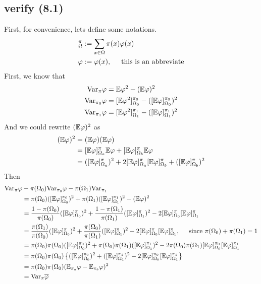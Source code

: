 \documentclass{article}
\begin{document}
\subsection{verify (8.1)}
First, for convenience, lets define some notations.
\begin{align*}
  [\E\varphi]_{\Omega}^\pi &:= \sum_{x\in\Omega} \pi(x)\varphi(x) \\
  \varphi &:= \varphi(x), \hspace{0.5cm} \mbox{this is an abbreviate}
\end{align*}
First, we know that
\begin{align*}
  \mathrm{Var}_\pi \varphi &= \mathbb{E}\varphi^2 - (\mathbb{E}\varphi)^2 \\
  \mathrm{Var}_{\pi_0}\varphi &= [\mathbb{E}\varphi^2]_{\Omega_0}^{\pi_0} - ( [\mathbb{E}\varphi]_{\Omega_0}^{\pi_0})^2 \\
  \mathrm{Var}_{\pi_1}\varphi &= [\mathbb{E}\varphi^2]_{\Omega_1}^{\pi_1} - ( [\mathbb{E}\varphi]_{\Omega_1}^{\pi_1})^2 
\end{align*}
And we could rewrite $(\mathbb{E}\varphi)^2$ as
\begin{align*}
  (\mathbb{E}\varphi)^2 &= (\mathbb{E}\varphi)(\mathbb{E}\varphi) \\
  &= [\mathbb{E}\varphi]_{\Omega_a}^\pi\mathbb{E}\varphi + [\mathbb{E}\varphi]_{\Omega_b}^\pi \mathbb{E}\varphi \\
&= ([\mathbb{E}\varphi]_{\Omega_a}^\pi)^2 + 2[\mathbb{E}\varphi]_{\Omega_a}^\pi[\mathbb{E}\varphi]_{\Omega_b}^\pi + ([\mathbb{E}\varphi]_{\Omega_b}^\pi)^2
\end{align*}
Then
\begin{align*}
  \mathrm{Var}_\pi\varphi &- \pi(\Omega_0)\mathrm{Var}_{\pi_0}\varphi - \pi(\Omega_1)\mathrm{Var}_{\pi_1} \\
  &= \pi(\Omega_0)([\mathbb{E}\varphi]_{\Omega_0}^{\pi_0})^2 + \pi(\Omega_1)([\mathbb{E}\varphi]_{\Omega_1}^{\pi_1})^2 - (\mathbb{E}\varphi)^2 \\
  &= \frac{1 - \pi(\Omega_0)}{\pi(\Omega_0)}([\mathbb{E}\varphi]_{\Omega_0}^{\pi})^2 + \frac{1-\pi(\Omega_1)}{\pi(\Omega_1)}([\mathbb{E}\varphi]_{\Omega_1}^{\pi})^2 - 2[\mathbb{E}\varphi]_{\Omega_0}^\pi[\mathbb{E}\varphi]_{\Omega_1}^\pi \\
  &= \frac{\pi(\Omega_1)}{\pi(\Omega_0)}([\mathbb{E}\varphi]_{\Omega_0}^{\pi})^2 + \frac{\pi(\Omega_0)}{\pi(\Omega_1)}([\mathbb{E}\varphi]_{\Omega_1}^{\pi})^2 - 2[\mathbb{E}\varphi]_{\Omega_0}^\pi[\mathbb{E}\varphi]_{\Omega_1}^\pi , \hspace{0.5cm} \mbox{since $\pi(\Omega_0) + \pi(\Omega_1) = 1$}\\
  &= \pi(\Omega_0)\pi(\Omega_0)([\mathbb{E}\varphi]_{\Omega_0}^{\pi_0})^2 + \pi(\Omega_0)\pi(\Omega_1)([\mathbb{E}\varphi]_{\Omega_1}^{\pi_1})^2 - 2\pi(\Omega_0)\pi(\Omega_1)[\mathbb{E}\varphi]_{\Omega_0}^{\pi_0}[\mathbb{E}\varphi]_{\Omega_1}^{\pi_1} \\
  &= \pi(\Omega_0)\pi(\Omega_0)\left\{([\mathbb{E}\varphi]_{\Omega_0}^{\pi_0})^2 + ([\mathbb{E}\varphi]_{\Omega_1}^{\pi_1})^2 - 2[\mathbb{E}\varphi]_{\Omega_0}^{\pi_0}[\mathbb{E}\varphi]_{\Omega_1}^{\pi_1} \right\} \\
  &= \pi(\Omega_0)\pi(\Omega_0)(\mathbb{E}_{\pi_a}\varphi - \mathbb{E}_{\pi_b}\varphi)^2 \\
  &= \mathrm{Var}_\pi \overline{\varphi}
\end{align*}
\end{document}
